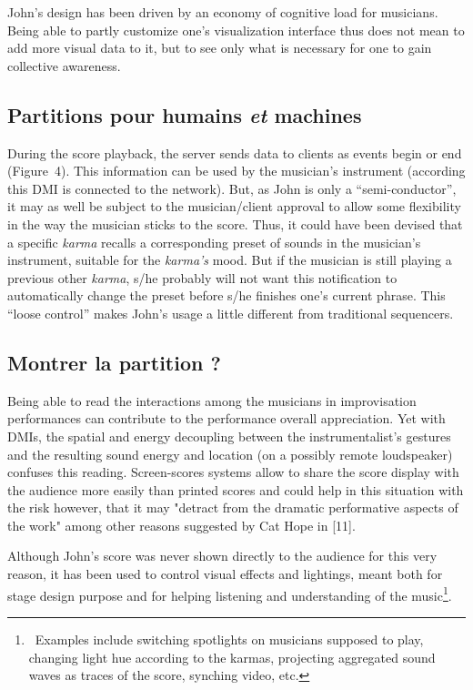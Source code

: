John's design has been driven by an economy of cognitive load for musicians. Being able to partly customize one's visualization interface thus does not mean to add more visual data to it, but to see only what is necessary for one to gain collective awareness.

\subsection{Partitions pour humains \emph{et} machines}

During the score playback, the server sends data to clients as events begin or end (Figure 4). This information can be used by the musician's instrument (according this DMI is connected to the network). But, as John is only a “semi-conductor”, it may as well be subject to the musician/client approval to allow some flexibility in the way the musician sticks to the score. Thus, it could have been devised that a specific \textit{karma} recalls a corresponding preset of sounds in the musician's instrument, suitable for the \textit{karma's} mood. But if the musician is still playing a previous other \textit{karma}, s/he probably will not want this notification to automatically change the preset before s/he finishes one's current phrase. This “loose control” makes John's usage a little different from traditional sequencers.

\subsection{Montrer la partition ?}

Being able to read the interactions among the musicians in improvisation performances can contribute to the performance overall appreciation. Yet with DMIs, the spatial and energy decoupling between the instrumentalist's gestures and the resulting sound energy and location (on a possibly remote loudspeaker) confuses this reading. Screen-scores systems allow to share the score display with the audience more easily than printed scores and could help in this situation with the risk however, that it may "detract from the dramatic performative aspects of the work" among other reasons suggested by Cat Hope in [11]. 

Although John's score was never shown directly to the audience for this very reason, it has been used to control visual effects and lightings, meant both for stage design purpose and for helping listening and understanding of the music\footnote{ Examples include switching spotlights on musicians supposed to play, changing light hue according to the karmas, projecting aggregated sound waves as traces of the score, synching video, etc.}.

